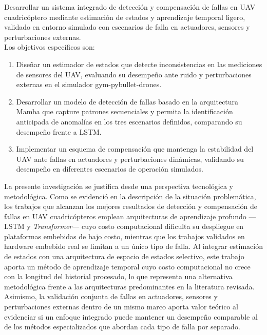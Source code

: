 Desarrollar un sistema integrado de 
detección y compensación de fallas en UAV cuadricóptero mediante 
estimación de estados y aprendizaje temporal ligero, validado en entorno simulado con escenarios de falla en 
actuadores, sensores y perturbaciones externas. \\

Los objetivos específicos son:
\begin{enumerate}
    \item  Diseñar un estimador de estados que detecte 
inconsistencias en las mediciones de sensores del UAV, evaluando 
su desempeño ante ruido y perturbaciones externas en el simulador 
gym-pybullet-drones.
    \item Desarrollar un modelo de detección de fallas basado en la arquitectura Mamba que capture patrones secuenciales y permita la identificación anticipada de anomalías en los tres escenarios definidos, comparando su desempeño frente a LSTM.

    \item  Implementar un esquema de compensación que mantenga la estabilidad del UAV ante fallas en actuadores y perturbaciones dinámicas, validando su desempeño en diferentes escenarios de operación simulados.
\end{enumerate}


\noindent La presente investigación se justifica desde una 
perspectiva tecnológica y metodológica. Como se evidenció en la 
descripción de la situación problemática, los trabajos que alcanzan 
los mejores resultados de detección y compensación de fallas en UAV 
cuadricópteros emplean arquitecturas de aprendizaje profundo —LSTM y 
\textit{Transformer}— cuyo costo computacional dificulta su 
despliegue en plataformas embebidas de bajo costo, mientras que los 
trabajos validados en hardware embebido real se limitan a un único 
tipo de falla. Al integrar estimación de estados con una 
arquitectura de espacio de estados selectivo, este trabajo aporta un 
método de aprendizaje temporal cuyo costo computacional no crece con 
la longitud del historial procesado, lo que representa una 
alternativa metodológica frente a las arquitecturas predominantes en 
la literatura revisada. Asimismo, la validación conjunta de fallas 
en actuadores, sensores y perturbaciones externas dentro de un mismo 
marco aporta valor teórico al evidenciar si un enfoque integrado 
puede mantener un desempeño comparable al de los métodos 
especializados que abordan cada tipo de falla por separado.

